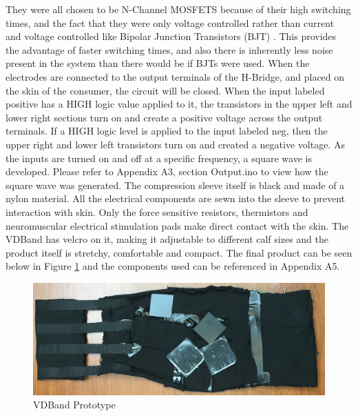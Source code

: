 \documentclass[11.5pt]{article}
\begin{document}
They were all chosen to be N-Channel MOSFETS because of their high switching times, and the fact that they were only voltage controlled rather than current and voltage controlled like Bipolar Junction Transistors (BJT) \cite{All}. This provides the advantage of faster switching times, and also there is inherently less noise present in the system than there would be if BJTs were used. When the electrodes are connected to the output terminals of the H-Bridge, and placed on the skin of the consumer, the circuit will be closed. When the input labeled positive has a HIGH logic value applied to it, the transistors in the upper left and lower right sections turn on and create a positive voltage across the output terminals. If a HIGH logic level is applied to the input labeled neg, then the upper right and lower left transistors turn on and created a negative voltage. As the inputs are turned on and off at a specific frequency, a square wave is developed. Please refer to Appendix A3, section Output.ino to view how the square wave was generated. The compression sleeve itself is black and made of a nylon material. All the electrical components are sewn into the sleeve to prevent interaction with skin. Only the force sensitive resistors, thermistors and neuromuscular electrical stimulation pads make direct contact with the skin. The VDBand has velcro on it, making it adjustable to different calf sizes and the product itself is stretchy, comfortable and compact. The final product can be seen below in Figure \ref{fig:VDB} and the components used can be referenced in Appendix A5.\\

\begin{figure}[H]
    \centering
    \includegraphics[width=0.9\linewidth]{titlepage/VDBand.JPG}
    \caption{VDBand Prototype}
    \label{fig:VDB}
\end{figure}
\vspace{0.5}
\end{document}
